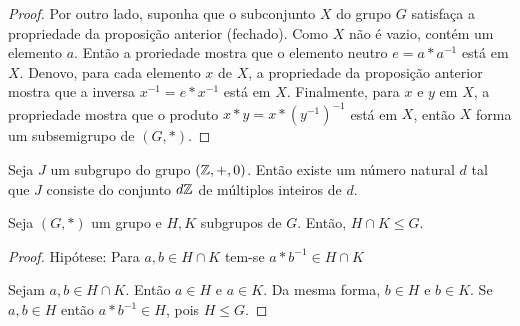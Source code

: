 \begin{definition}[Magma]
\begin{stat}
\begin{proof}
               Por outro lado, suponha que o subconjunto $X$ do grupo $G$ satisfaça a propriedade da proposição anterior (fechado). Como $X$ não é vazio, contém um elemento $a$. Então a proriedade mostra que o elemento neutro $e = a * a^{-1}$ está em $X$. Denovo, para cada elemento $x$ de $X$, a propriedade da proposição anterior mostra que a inversa $x^{-1} = e * x^{-1}$ está em $X$. Finalmente, para $x$ e $y$ em $X$, a propriedade mostra que o produto $x*y=x*(y^{-1})^{-1}$ está em $X$, então $X$ forma um subsemigrupo de $(G,*)$.
            \end{proof}
         \end{stat}
         \begin{theorem}
            Seja $J$ um subgrupo do grupo $(\mathbb{Z},+,0)$. Então existe um número natural $d$ tal que $J$ consiste do conjunto $d\mathbb{Z}$ de múltiplos inteiros de $d$.
         \end{theorem}
         \begin{theorem}
            Seja $(G,*)$ um grupo e $H,K$ subgrupos de $G$. Então, $H\cap K \leq G$.
            \begin{proof}
               Hipótese: Para $a,b \in H \cap K$ tem-se $a * b^{-1} \in H \cap K$

               Sejam $a,b \in H \cap K$. Então $a \in H$ e $a \in K$. Da mesma forma, $b \in H$ e $b \in K$. Se $a,b \in H$ então $a * b^{-1} \in H$, pois $H \leq G$.


\end{proof}
\end{theorem}
\end{definition}

